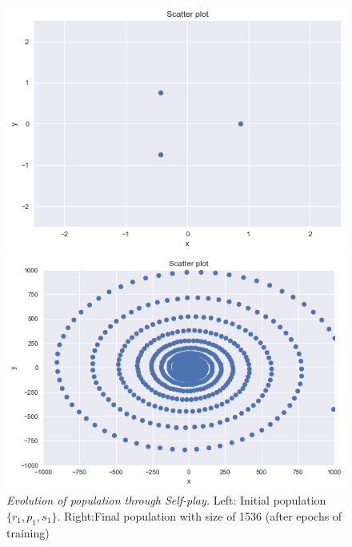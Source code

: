 \documentclass{article}
\begin{document}
\begin{figure}[!ht]
	\begin{minipage}{0.5\linewidth}
		\centering
		\includegraphics[scale=0.4]{self1}
	\end{minipage}%
	\begin{minipage}{0.5\linewidth}
		\centering
		\includegraphics[scale=0.4]{self15}
	\end{minipage}%
	\caption{\textit{Evolution of population through Self-play.} Left: Initial population $\{r_1,p_1,s_1\}$. Right:Final population with size of 1536 (after epochs of training)}
	\label{fig:self}
\end{figure}
\end{document}
